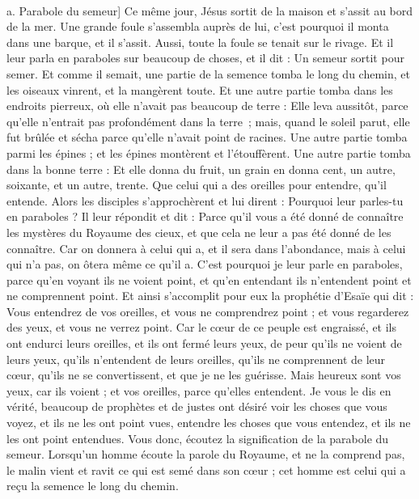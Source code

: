 \begin{multicols}{2}
{{\\a. Parabole du semeur]}
\VerseOne{}Ce même jour, Jésus sortit de la maison et s'assit au bord de la mer.
Une grande foule s'assembla auprès de lui, c’est pourquoi il monta dans une barque, et il s'assit. Aussi, toute la foule se tenait sur le rivage.
Et il leur parla en paraboles sur beaucoup de choses, et il dit : Un semeur sortit pour semer.
Et comme il semait, une partie de la semence tomba le long du chemin, et les oiseaux vinrent, et la mangèrent toute.
Et une autre partie tomba dans les endroits pierreux, où elle n'avait pas beaucoup de terre : Elle leva aussitôt, parce qu'elle n'entrait pas profondément dans la terre ;
mais, quand le soleil parut, elle fut brûlée et sécha parce qu'elle n'avait point de racines.
Une autre partie tomba parmi les épines ; et les épines montèrent et l'étouffèrent.
Une autre partie tomba dans la bonne terre : Et elle donna du fruit, un grain en donna cent, un autre, soixante, et un autre, trente.
Que celui qui a des oreilles pour entendre, qu'il entende.
Alors les disciples s'approchèrent et lui dirent : Pourquoi leur parles-tu en paraboles ?
Il leur répondit et dit : Parce qu'il vous a été donné de connaître les mystères du Royaume des cieux, et que cela ne leur a pas été donné de les connaître.
Car on donnera à celui qui a, et il sera dans l’abondance, mais à celui qui n'a pas, on ôtera même ce qu’il a.
C'est pourquoi je leur parle en paraboles, parce qu'en voyant ils ne voient point, et qu'en entendant ils n'entendent point et ne comprennent point.
Et ainsi s'accomplit pour eux la prophétie d'Esaïe qui dit : Vous entendrez de vos oreilles, et vous ne comprendrez point ; et vous regarderez des yeux, et vous ne verrez point.
Car le cœur de ce peuple est engraissé, et ils ont endurci leurs oreilles, et ils ont fermé leurs yeux, de peur qu'ils ne voient de leurs yeux, qu'ils n'entendent de leurs oreilles, qu'ils ne comprennent de leur cœur, qu’ils ne se convertissent, et que je ne les guérisse{}.
Mais heureux sont vos yeux, car ils voient ; et vos oreilles, parce qu’elles entendent.
Je vous le dis en vérité, beaucoup de prophètes et de justes ont désiré voir les choses que vous voyez, et ils ne les ont point vues, entendre les choses que vous entendez, et ils ne les ont point entendues.
Vous donc, écoutez la signification de la parabole du semeur.
Lorsqu’un homme écoute la parole du Royaume, et ne la comprend pas, le malin vient et ravit ce qui est semé dans son cœur ; cet homme est celui qui a reçu la semence le long du chemin.
}
\end{multicols}
